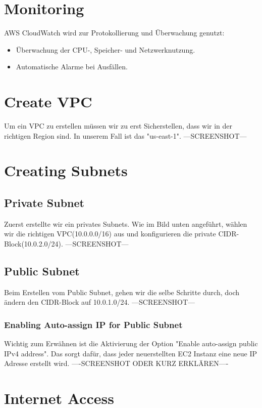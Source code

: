 \documentclass[a4paper,12pt]{article}
\begin{document}
\section{Monitoring}
AWS CloudWatch wird zur Protokollierung und Überwachung genutzt:
\begin{itemize}
	\item Überwachung der CPU-, Speicher- und Netzwerknutzung.
	\item Automatische Alarme bei Ausfällen.
\end{itemize}

\section{Create VPC}

Um ein VPC zu erstellen müssen wir zu erst Sicherstellen, dass wir in der richtigen Region sind. 
In unserem Fall ist das "us-east-1". 
---SCREENSHOT---

\section{Creating Subnets}
\subsection{Private Subnet}

Zuerst erstellte wir ein privates Subnets. 
Wie im Bild unten angeführt, wählen wir die richtigen VPC(10.0.0.0/16) aus
und konfigurieren die private CIDR-Block(10.0.2.0/24).
---SCREENSHOT---

\subsection{Public Subnet}
Beim Erstellen vom Public Subnet, gehen wir die selbe Schritte durch,
doch ändern den CIDR-Block auf 10.0.1.0/24.
---SCREENSHOT---


\subsubsection{Enabling Auto-assign IP for Public Subnet}
Wichtig zum Erwähnen ist die Aktivierung der Option "Enable auto-assign public IPv4 address". 
Das sorgt dafür, dass jeder neuerstellten EC2 Instanz eine neue IP Adresse erstellt wird.
----SCREENSHOT ODER KURZ ERKLÄREN----



\section{Internet Access}
\end{document}
